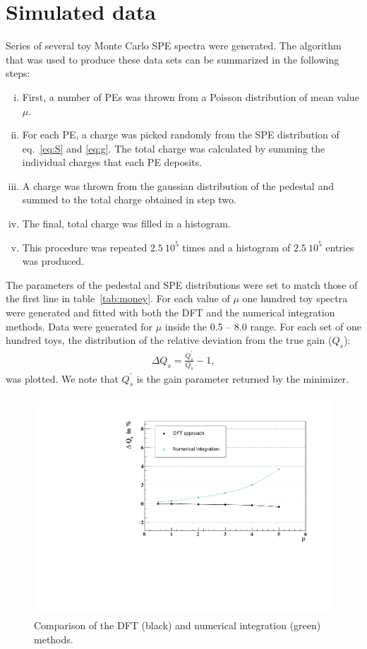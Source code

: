 \documentclass[a4paper,11pt]{article}
\begin{document}
\section{Simulated data}
\label{sec:mc}

Series of several toy Monte Carlo SPE spectra were generated. 
The algorithm that was used to produce these data sets can be summarized in the following steps:
\begin{enumerate}[i.]
\item First, a number of PEs was thrown from a Poisson distribution of mean value $\mu$.
\item For each PE, a charge was picked randomly from the SPE distribution of eq.~\eqref{eq:S} and \eqref{eq:g}. 
The total charge was calculated by summing the individual charges that each PE deposits. 
\item A charge was thrown from the gaussian distribution of the pedestal and summed to the total charge obtained in step two. 
\item The final, total charge was filled in a histogram.  
\item This procedure was repeated $2.5\  10^5$ times and a histogram of $2.5\  10^5$ entries was produced. 
\end{enumerate}
The parameters of the pedestal and SPE distributions were set to match those of the first line in table~\ref{tab:money}. 
For each value of $\mu$ one hundred toy spectra were generated and fitted with both the DFT and the numerical integration methods. 
Data were generated for $\mu$ inside the 0.5 -- 8.0 range. For each set of one hundred toys, the distribution of the relative deviation from the true gain ($Q_s$):
\begin{align}
\Delta Q_s = \frac{Q_s^\prime}{Q_s} - 1,
\end{align}  
was plotted. We note that $Q_s^\prime$ is the gain parameter returned by the minimizer. 

\begin{figure}[!t]
\centering
\includegraphics[width=11.5cm, height=8.2cm]{figures/comp.pdf} 
\caption{Comparison of the DFT (black) and numerical integration (green) methods. }
\label{fig:comp}
\end{figure}
\end{document}
